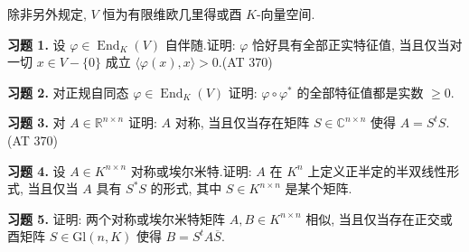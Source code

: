 \aufgaben

除非另外规定, $V$ 恒为有限维欧几里得或酉 $K$-向量空间.

\medskip
\noindent\textbf{习题 1.} 设 $\varphi \in \operatorname{End}_K(V)$ 自伴随.证明: $\varphi$ 恰好具有全部正实特征值, 当且仅当对一切 $x \in V - \{0\}$ 成立 $\langle \varphi(x), x \rangle > 0$.(AT 370)

\medskip
\noindent\textbf{习题 2.} 对正规自同态 $\varphi \in \operatorname{End}_K(V)$ 证明: $\varphi \circ \varphi^*$ 的全部特征值都是实数 $\geq 0$.

\medskip
\noindent\textbf{习题 3.} 对 $A \in \mathbb{R}^{n \times n}$ 证明: $A$ 对称, 当且仅当存在矩阵 $S \in \mathbb{C}^{n \times n}$ 使得 $A = S^t S$.(AT 370)

\medskip
\noindent\textbf{习题 4.} 设 $A \in K^{n \times n}$ 对称或埃尔米特.证明: $A$ 在 $K^n$ 上定义正半定的半双线性形式, 当且仅当 $A$ 具有 $S^* S$ 的形式, 其中 $S \in K^{n \times n}$ 是某个矩阵.

\medskip
\noindent\textbf{习题 5.} 证明: 两个对称或埃尔米特矩阵 $A, B \in K^{n \times n}$ 相似, 当且仅当存在正交或酉矩阵 $S \in \mathrm{Gl}(n, K)$ 使得 $B = S^t A \overline{S}$.
